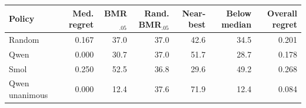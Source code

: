 

\footnotesize
\begin{tabular*}{\textwidth}{@{\extracolsep{\fill}}lrrrrrr}
\toprule
Policy & Med. regret & BMR$_{.05}$ & Rand. BMR$_{.05}$ & Near-best & Below median & Overall regret\\
\midrule
Random & 0.167 & 37.0 & 37.0 & 42.6 & 34.5 & 0.201\\
Qwen & 0.000 & 30.7 & 37.0 & 51.7 & 28.7 & 0.178\\
Smol & 0.250 & 52.5 & 36.8 & 29.6 & 49.2 & 0.268\\
Qwen unanimous & 0.000 & 12.4 & 37.6 & 71.9 & 12.4 & 0.084\\
\bottomrule
\end{tabular*}
